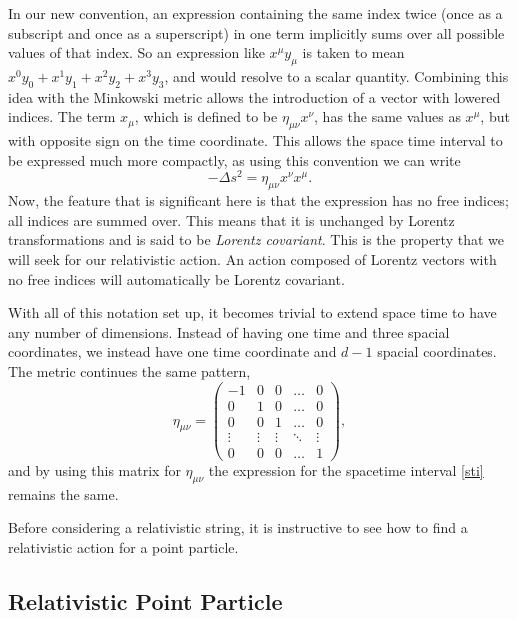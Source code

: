 \documentclass[a4paper,12pt]{article}
\numberwithin{equation}{section}
\begin{document}
In our new convention, an expression containing the same index twice (once as a subscript and once as a superscript) in one term implicitly sums over all possible values of that index. So an expression like $x^\mu y_\mu$ is taken to mean $x^0y_0+x^1y_1 + x^2y_2 + x^3y_3$, and would resolve to a scalar quantity. Combining this idea with the Minkowski metric allows the introduction of a vector with lowered indices. The term $x_\mu$, which is defined to be $\eta_{\mu \nu} x^\nu$, has the same values as $x^\mu$, but with opposite sign on the time coordinate. This allows the space time interval to be expressed much more compactly, as using this convention we can write
\begin{equation}\label{sti}
-\Delta s ^2  = \eta_{\mu \nu} x^\nu x^\mu.
\end{equation}
Now, the feature that is significant here is that the expression has no free indices; all indices are summed over. This means that it is unchanged by Lorentz transformations and is said to be \emph{Lorentz covariant}. This is the property that we will seek for our relativistic action. An action composed of Lorentz vectors with no free indices will automatically be Lorentz covariant.

With all of this notation set up, it becomes trivial to extend space time to have any number of dimensions. Instead of having one time and three spacial coordinates, we instead have one time coordinate and $d-1$ spacial coordinates. The metric continues the same pattern, 
\begin{equation}
\eta _{\mu \nu} =  \begin{pmatrix} -1 & 0 & 0  & \dots & 0\\ 0 & 1 &  0 & \dots &0\\ 0 & 0 & 1 &\dots&0 \\  \vdots &\vdots & \vdots & \ddots&\vdots\\0 & 0 & 0 & \dots & 1 \end{pmatrix}, 
\end{equation}
and by using this matrix for $\eta_{\mu\nu}$ the expression for the spacetime interval \ref{sti} remains the same.


Before considering a relativistic string, it is instructive to see how to find a relativistic action for a point particle.

\subsection{Relativistic Point Particle}\label{sectionpoint}
\end{document}
